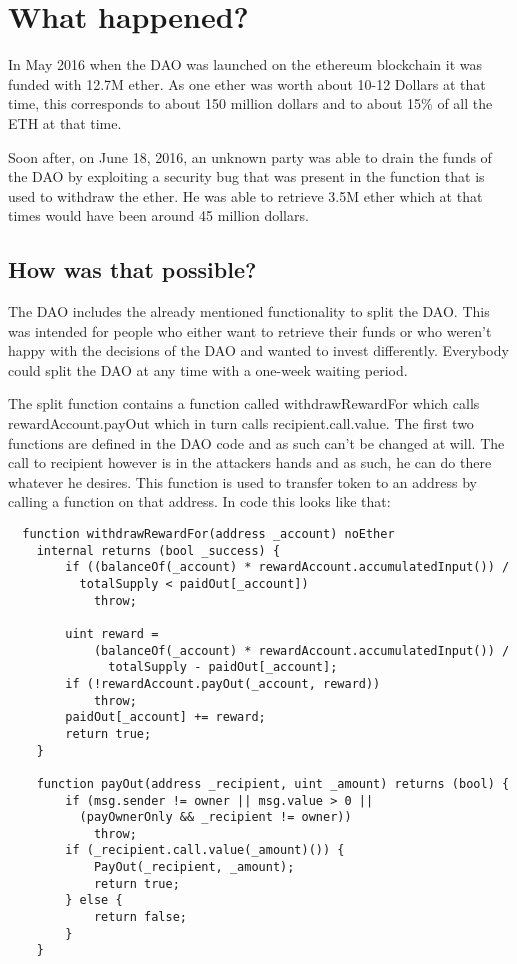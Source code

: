\documentclass[a4paper, 11pt]{scrartcl}
\begin{document}
\section{What happened?}

In May 2016 when the DAO was launched on the ethereum blockchain it was funded with 12.7M ether.
As one ether was worth about 10-12 Dollars at that time, this corresponds to about 150 million dollars and to about 15\% of all the ETH at that time.\cite{understandingDAO}

Soon after, on June 18, 2016, an unknown party was able to drain the funds of the DAO by exploiting a security bug that was present in the function that is used to withdraw the ether.
He was able to retrieve 3.5M ether which at that times would have been around 45 million dollars.

\subsection{How was that possible?}

The DAO includes the already mentioned functionality to split the DAO.
This was intended for people who either want to retrieve their funds or who weren't happy with the decisions of the DAO and wanted to invest differently.
Everybody could split the DAO at any time with a one-week waiting period.

The split function contains a function called withdrawRewardFor which calls rewardAccount.payOut which in turn calls \textunderscore recipient.call.value. The first two functions are defined in the DAO code and as such can't be changed at will. The call to recipient however is in the attackers hands and as such, he can do there whatever he desires. This function is used to transfer token to an address by calling a function on that address. In code this looks like that: \cite{deconstructingDaoAttack}

\begin{verbatim}
  function withdrawRewardFor(address _account) noEther 
    internal returns (bool _success) {
        if ((balanceOf(_account) * rewardAccount.accumulatedInput()) /
          totalSupply < paidOut[_account])
            throw;

        uint reward =
            (balanceOf(_account) * rewardAccount.accumulatedInput()) /
              totalSupply - paidOut[_account];
        if (!rewardAccount.payOut(_account, reward))
            throw;
        paidOut[_account] += reward;
        return true;
    }

    function payOut(address _recipient, uint _amount) returns (bool) {
        if (msg.sender != owner || msg.value > 0 ||
          (payOwnerOnly && _recipient != owner))
            throw;
        if (_recipient.call.value(_amount)()) {
            PayOut(_recipient, _amount);
            return true;
        } else {
            return false;
        }
    }
\end{verbatim}
\end{document}
